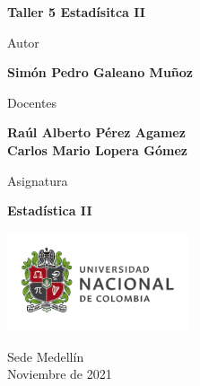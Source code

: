 \begin{titlepage}
   \Large{
   \begin{center}
       \vspace*{1cm}

       \textbf{Taller 5 Estadísitca II}

            
       \vspace{1cm}
       
       Autor
       
       \vspace{0.5cm}
        
        
       \textbf{Simón Pedro Galeano Muñoz} \\
       
              \vspace{1cm}
       
       Docentes
       
       \vspace{0.5cm}

	\textbf{Raúl Alberto Pérez Agamez} \\
	\textbf{Carlos Mario Lopera Gómez}
       
       \vspace{0.4cm}

       \vspace{1.5cm}
       
       Asignatura
       
       \vspace{0.5cm}

       \textbf{Estadística II}

       \vfill

            
       \vspace{0.1cm}
     
       \includegraphics[width=0.4\textwidth]{logounal.png}
            
       Sede Medellín\\
       Noviembre de 2021
       
   \end{center}
   }
\end{titlepage}
